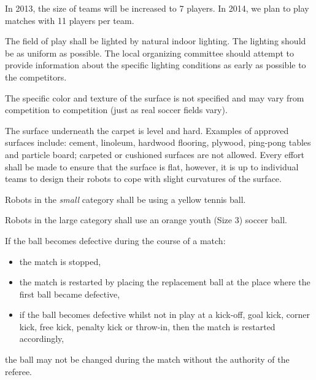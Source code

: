 \documentclass[12pt]{hurocup}
\begin{document}
\begin{decisions}

\item In 2013, the size of teams will be increased to 7 players. In
  2014, we plan to play matches with 11 players per team.

\item The field of play shall be lighted by natural indoor
  lighting. The lighting should be as uniform as possible. The local
  organizing committee should attempt to provide information about the
  specific lighting conditions as early as possible to the
  competitors.
  
\item The specific color and texture of the surface is not specified
  and may vary from competition to competition (just as real soccer
  fields vary). 

\item The surface underneath the carpet is level and
  hard. Examples of approved surfaces include: cement, linoleum,
  hardwood flooring, plywood, ping-pong tables and particle board;
  carpeted or cushioned surfaces are not allowed. Every effort shall
  be made to ensure that the surface is flat, however, it is up to
  individual teams to design their robots to cope with slight
  curvatures of the surface.

\end{decisions}

\label{law:ball}

\begin{lawlist}[US]
\item Robots in the \textit{small} category shall be using a yellow
 tennis ball.

\item Robots in the large category shall use an orange youth (Size 3)
soccer ball. 

\item If the ball becomes defective during the course of a match:
  \begin{itemize}
  \item the match is stopped,
  \item the match is restarted by placing the replacement ball at the place where the first ball became defective, 
  \item if the ball becomes defective whilst not in play at a
    kick-off, goal kick, corner kick, free kick, penalty kick or
    throw-in, then the match is restarted accordingly,
  \end{itemize}
\item the ball may not be changed during the match without the authority of the referee.

\end{lawlist}
\end{document}
